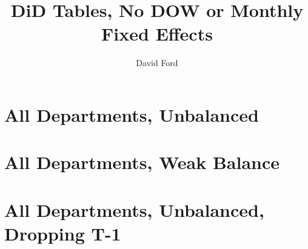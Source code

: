 \documentclass[12pt,a4paper]{article}
\begin{document}

\title{DiD Tables, No DOW or Monthly Fixed Effects}
\author{David Ford}
\maketitle


\pagebreak

\section{All Departments, Unbalanced}

\begin{center}

\end{center}

\begin{center}

\end{center}

\pagebreak

\section{All Departments, Weak Balance}

\begin{center}

\end{center}

\begin{center}

\end{center}

\pagebreak

\section{All Departments, Unbalanced, Dropping T-1}

\begin{center}

\end{center}
\end{document}
